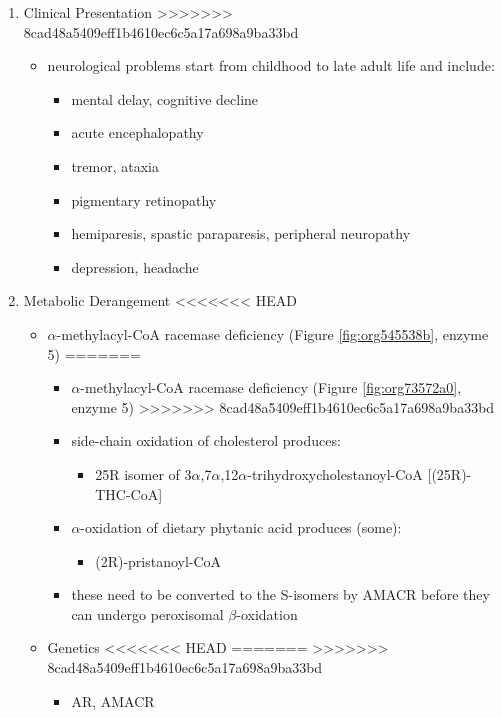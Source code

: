 \documentclass{scrartcl}
\begin{document}
\begin{itemize}
\begin{enumerate}
\begin{enumerate}
\begin{enumerate}
\begin{itemize}
\begin{enumerate}
\begin{enumerate}
\begin{enumerate}
\item Clinical Presentation
\label{sec:org5514862}
>>>>>>> 8cad48a5409eff1b4610ec6c5a17a698a9ba33bd
\begin{itemize}
\item neurological problems start from childhood to late adult life and
include:
\begin{itemize}
\item mental delay, cognitive decline
\item acute encephalopathy
\item tremor, ataxia
\item pigmentary retinopathy
\item hemiparesis, spastic paraparesis, peripheral neuropathy
\item depression, headache
\end{itemize}
\end{itemize}

\item Metabolic Derangement
<<<<<<< HEAD
\label{sec:org0240524}
\begin{itemize}
\item \(\alpha\)-methylacyl-CoA racemase deficiency (Figure \ref{fig:org545538b}, enzyme 5)
=======
\label{sec:orgc79dafa}
\begin{itemize}
\item \(\alpha\)-methylacyl-CoA racemase deficiency (Figure \ref{fig:org73572a0}, enzyme 5)
>>>>>>> 8cad48a5409eff1b4610ec6c5a17a698a9ba33bd
\item side-chain oxidation of cholesterol produces:
\begin{itemize}
\item 25R isomer of 3\(\alpha\),7\(\alpha\),12\(\alpha\)-trihydroxycholestanoyl-CoA [(25R)-THC-CoA]
\end{itemize}
\item \(\alpha\)-oxidation of dietary phytanic acid produces (some):
\begin{itemize}
\item (2R)-pristanoyl-CoA
\end{itemize}
\item these need to be converted to the S-isomers by AMACR before they can
undergo peroxisomal \(\beta\)-oxidation
\end{itemize}

\item Genetics
<<<<<<< HEAD
\label{sec:orgf209f5c}
=======
\label{sec:org89c56ce}
>>>>>>> 8cad48a5409eff1b4610ec6c5a17a698a9ba33bd
\begin{itemize}
\item AR, AMACR
\end{itemize}


\end{itemize}
\end{enumerate}
\end{enumerate}
\end{enumerate}
\end{itemize}
\end{enumerate}
\end{enumerate}
\end{enumerate}
\end{itemize}
\end{document}
